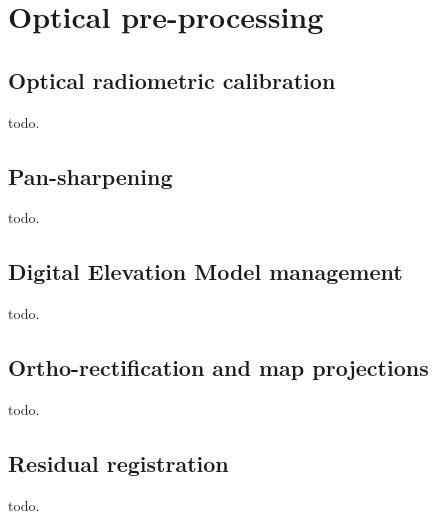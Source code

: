 \section{Optical pre-processing}\label{sec:optpreproc}

\subsection{Optical radiometric calibration}\label{ssec:optcal}

todo.

\subsection{Pan-sharpening}\label{ssec:pxs}

todo.

\subsection{Digital Elevation Model management}\label{ssec:dem}

todo.

\subsection{Ortho-rectification and map projections}\label{ssec:ortho}

todo.

\subsection{Residual registration}\label{ssec:registration}

todo.
